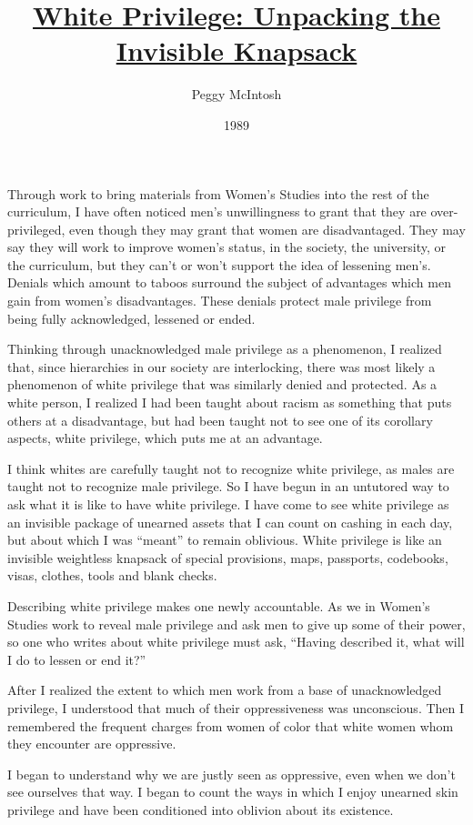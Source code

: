\documentclass{article}
\title{\href{}{White Privilege: Unpacking the Invisible Knapsack}}
\author{Peggy McIntosh}
\date{1989}
\begin{document}
\maketitle

Through work to bring materials from Women's Studies into the rest of the
curriculum, I have often noticed men's unwillingness to grant that they are
over-privileged, even though they may grant that women are disadvantaged. They
may say they will work to improve women's status, in the society, the
university, or the curriculum, but they can't or won't support the idea of
lessening men's. Denials which amount to taboos surround the subject of
advantages which men gain from women's disadvantages. These denials protect
male privilege from being fully acknowledged, lessened or ended.

Thinking through unacknowledged male privilege as a phenomenon, I realized
that, since hierarchies in our society are interlocking, there was most likely
a phenomenon of white privilege that was similarly denied and protected. As a
white person, I realized I had been taught about racism as something that puts
others at a disadvantage, but had been taught not to see one of its corollary
aspects, white privilege, which puts me at an advantage.

I think whites are carefully taught not to recognize white privilege, as males
are taught not to recognize male privilege. So I have begun in an untutored way
to ask what it is like to have white privilege. I have come to see white
privilege as an invisible package of unearned assets that I can count on
cashing in each day, but about which I was ``meant'' to remain oblivious. White
privilege is like an invisible weightless knapsack of special provisions, maps,
passports, codebooks, visas, clothes, tools and blank checks.

Describing white privilege makes one newly accountable. As we in Women's
Studies work to reveal male privilege and ask men to give up some of their
power, so one who writes about white privilege must ask, ``Having described it,
what will I do to lessen or end it?''

After I realized the extent to which men work from a base of unacknowledged
privilege, I understood that much of their oppressiveness was unconscious. Then
I remembered the frequent charges from women of color that white women whom
they encounter are oppressive.

I began to understand why we are justly seen as oppressive, even when we don't
see ourselves that way. I began to count the ways in which I enjoy unearned
skin privilege and have been conditioned into oblivion about its existence.
\end{document}

